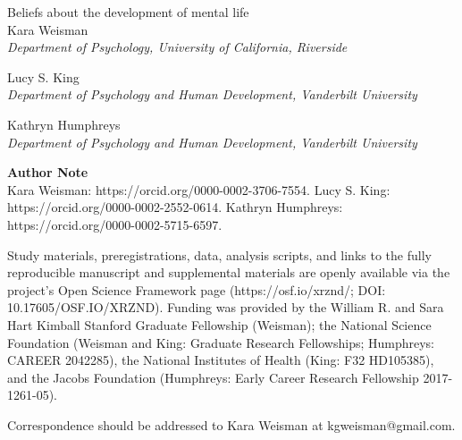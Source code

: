 \begin{titlepage}
    \begin{center}
        \vspace*{1in}
        {\Large Beliefs about the development of mental life} \\[2cm]
        
        Kara Weisman\\
        \textit{Department of Psychology, University of California, Riverside}\par
        \vspace{0.5cm}
        Lucy S. King\\
        \textit{Department of Psychology and Human Development, Vanderbilt University}\par
        \vspace{0.5cm}
        Kathryn Humphreys\\
        \textit{Department of Psychology and Human Development, Vanderbilt University}\par
    
    \end{center}
    \vfill
    \textbf{Author Note} \\
    \setlength{\parindent}{2em}
    \indent Kara Weisman: https://orcid.org/0000-0002-3706-7554. Lucy S. King: https://orcid.org/0000-0002-2552-0614. Kathryn Humphreys: https://orcid.org/0000-0002-5715-6597.

    \indent Study materials, preregistrations, data, analysis scripts, and links to the fully reproducible manuscript and supplemental materials are openly available via the project’s Open Science Framework page (https://osf.io/xrznd/; DOI: 10.17605/OSF.IO/XRZND). Funding was provided by the William R. and Sara Hart Kimball Stanford Graduate Fellowship (Weisman); the National Science Foundation (Weisman and King: Graduate Research Fellowships; Humphreys: CAREER 2042285), the National Institutes of Health (King: F32 HD105385), and the Jacobs Foundation (Humphreys: Early Career Research Fellowship 2017-1261-05).

    \indent Correspondence should be addressed to Kara Weisman at kgweisman@gmail.com.
\end{titlepage}
